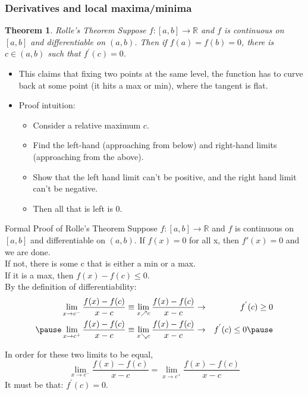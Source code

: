 \documentclass{beamer}
\newtheorem{thm}{Theorem}
\numberwithin{equation}{section}
\begin{document}
\begin{frame}
\frametitle{Derivatives and local maxima/minima}

\begin{thm} Rolle's Theorem Suppose $f:[a,b] \rightarrow \mathbb{R}$ and $f$ is continuous on $[a,b]$ and differentiable on $(a,b)$.  Then if $f(a) = f(b) = 0$, there is $c \in (a, b)$ such that $f^{'}(c) = 0$.  \end{thm}\pause

\begin{itemize}
\item This claims that fixing two points at the same level, the function has to curve back at some point (it hits a max or min), where the tangent is flat.\pause
\item Proof intuition:\pause
\begin{itemize}
\item Consider a relative maximum $c$. \pause
\item Find the left-hand (approaching from below) and right-hand limits (approaching from the above).\pause
\item Show that the left hand limit can't be positive, and the right hand limit can't be negative.
\item Then all that is left is 0.
\end{itemize}
\end{itemize}
\end{frame}


\begin{frame}{Formal Proof of Rolle's Theorem}
Suppose $f:[a,b] \rightarrow \mathbb{R}$ and $f$ is continuous on $[a,b]$ and differentiable on $(a,b)$.  \pause
If $f(x)=0$ for all x, then $f'(x)=0$ and we are done.\\ \pause
If not, there is some c that is either a min or a max.\\
If it is a max, then $f(x)-f(c)\leq0$. \pause\\
By the definition of differentiability: \pause
\begin{eqnarray}
\lim_{x \rightarrow c^{-}} \frac{f(x) - f(c) } {x - c} \equiv \lim_{x\nearrow c} \frac{f(x) - f(c ) }{x - c } & \rightarrow & f^{'}(c)\geq0 \nonumber \\\pause 
\lim_{x \rightarrow c^{+}} \frac{f(x) - f(c) } {x - c} \equiv \lim_{x \searrow c} \frac{f(x) - f(c) } {x - c }  & \rightarrow & f^{'}(c)\leq0  \nonumber \pause
\end{eqnarray}

In order for these two limits to be equal, \\
$$\lim_{x \rightarrow c^{-}} \frac{f(x) - f(c) }{x -c}  = \lim_{x \rightarrow c^{+}} \frac{f(x) - f(c) } {x - c} $$
It must be that: $f^{'}(c) = 0$.  

\end{frame}
\end{document}
